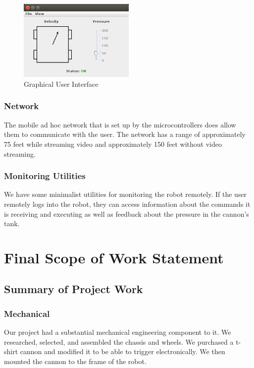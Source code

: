 \documentclass[letterpaper,12pt]{article}
\begin{document}
\begin{figure}[h!]
  \centering
  \includegraphics[width=0.5\textwidth]{pics/gui.png}
  \caption{Graphical User Interface}
  \label{fig:gui}
\end{figure}

\subsubsection{Network}
The mobile ad hoc network that is set up by the microcontrollers does allow them
to communicate with the user. The network has a range of approximately 75 feet
while streaming video and approximately 150 feet without video streaming.

\subsubsection{Monitoring Utilities}
We have some minimalist utilities for monitoring the robot remotely. If the user
remotely logs into the robot, they can access information about the commands it
is receiving and executing as well as feedback about the pressure in the
cannon's tank.


\section{Final Scope of Work Statement}
\label{sec:finalscope}

\subsection{Summary of Project Work}
\subsubsection{Mechanical}
Our project had a substantial mechanical engineering component to it. We
researched, selected, and assembled the chassis and wheels. We purchased a
t-shirt cannon and modified it to be able to trigger electronically. We then
mounted the cannon to the frame of the robot.
\end{document}
